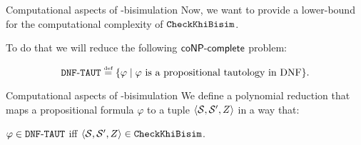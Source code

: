\documentclass{beamer}
\begin{document}
\begin{frame}{Computational aspects of \KHilogic-bisimulation}
    Now, we want to provide a lower-bound for the computational complexity of $\mathtt{CheckKhiBisim}$.\pause

    To do that we will reduce the following $\rm\textsf{coNP-complete}$ problem:\pause

    \begin{definition}
        \[ 
            \dnftautpb \eqdef \set{\varphi \mid \varphi \text{ is a propositional tautology in DNF}}.
        \]
    \end{definition}
\end{frame}


\begin{frame}{Computational aspects of \KHilogic-bisimulation}
    We define a polynomial reduction that maps a propositional formula $\varphi$ to a tuple $\langle \mathcal{S},\mathcal{S}',Z \rangle$ 
    in a way that:\pause 
    \begin{center}
        $\varphi\in\mathtt{DNF{\text{-}}TAUT}$ iff $\langle \mathcal{S},\mathcal{S}',Z \rangle\in\mathtt{CheckKhiBisim}$.
    \end{center}
\end{frame}
\end{document}
